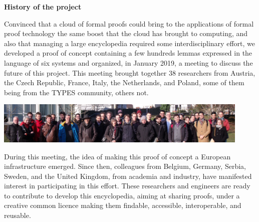 \begin{framed}

\begin{center}
{\bf \Large History of the project}
\end{center}

Convinced that a cloud of formal proofs could bring to the
applications of formal proof technology the same boost that the cloud
has brought to computing, and also that managing a large encyclopedia
required some interdisciplinary effort, 
we developed a proof of concept containing a few hundreds lemmas 
expressed in the language of six systems and organized, in January 2019,
a meeting to discuss the future of this project.
This
meeting brought together 38 researchers from Austria, the Czech
Republic, France, Italy, the Netherlands, and Poland, some of them 
being from the TYPES community, others not.
\begin{center}
\includegraphics[height=2cm]{photo.png}
\end{center}
During this meeting, the idea of making this proof of concept a European 
infrastructure emerged.
Since then,
colleagues from Belgium, Germany, Serbia, Sweden, and the United
Kingdom, from academia and industry, have manifested interest in
participating in this effort.  These researchers and engineers are
ready to contribute to develop this encyclopedia, aiming at sharing
proofs, under a creative common licence making them findable,
accessible, interoperable, and reusable.

\end{framed}


